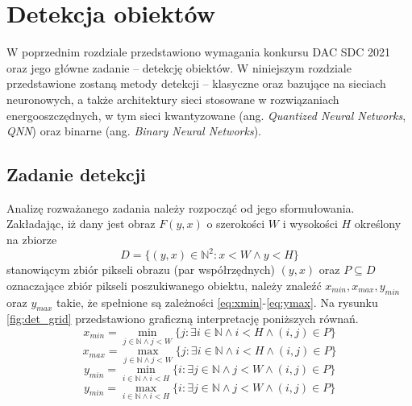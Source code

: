 \chapter{Detekcja obiektów}

W poprzednim rozdziale przedstawiono wymagania konkursu DAC SDC 2021 oraz jego główne zadanie -- detekcję obiektów. 
W niniejszym rozdziale przedstawione zostaną metody detekcji -- klasyczne oraz bazujące na sieciach neuronowych, 
a także architektury sieci stosowane w rozwiązaniach energooszczędnych, w tym sieci kwantyzowane (ang. \emph{Quantized Neural Networks}, \emph{QNN}) oraz binarne (ang. \emph{Binary Neural Networks}).

\section{Zadanie detekcji}

Analizę rozważanego zadania należy rozpocząć od jego sformułowania. 
Zakładając, iż dany jest obraz $F(y,x)$ 
o szerokości $W$ i wysokości $H$
określony na zbiorze 
\begin{equation}
D = \{(y,x) \in \mathbb{N} ^2 : x < W \land y < H\}
\end{equation}
stanowiącym zbiór pikseli obrazu (par współrzędnych) $(y,x)$ 
oraz $P \subseteq D$ oznaczające zbiór pikseli poszukiwanego obiektu, należy znaleźć $x_{min},x_{max},y_{min}$ oraz $y_{max}$ takie, że spełnione są zależności \eqref{eq:xmin}-\eqref{eq:ymax}.
Na rysunku \ref{fig:det_grid} przedstawiono graficzną interpretację poniższych równań.
\begin{equation}
x_{min} = \min_{j \in \mathbb{N} \land j < W }\{j : \exists i \in \mathbb{N} \land i < H \land (i,j) \in P \}
\label{eq:xmin}
\end{equation}
\begin{equation}
x_{max} = \max_{j \in \mathbb{N} \land j < W }\{j : \exists i \in \mathbb{N} \land i < H  \land (i,j) \in P \}
\label{eq:xmax}
\end{equation}
\begin{equation}
y_{min} = \min_{i \in \mathbb{N} \land i < H }\{i : \exists j \in \mathbb{N} \land j < W \land (i,j) \in P \}
\label{eq:ymin}
\end{equation}
\begin{equation}
y_{min} = \max_{i \in \mathbb{N} \land i < H }\{i: \exists j \in \mathbb{N} \land j < W \land (i,j) \in P \}
\label{eq:ymax}
\end{equation}

